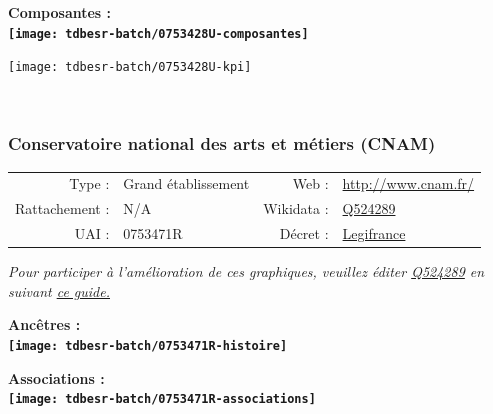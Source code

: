 \documentclass[12pt,french,]{article}
\begin{document}
\begin{center} \bf Composantes : \\  
\texttt{[image: tdbesr-batch/0753428U-composantes]} \end{center}

\begin{center}\texttt{[image: tdbesr-batch/0753428U-kpi]} \end{center}\checkoddpage

\ifoddpage \fi ~\newpage  

\hypertarget{conservatoire-national-des-arts-et-muxe9tiers-cnam}{%
\subsubsection{Conservatoire national des arts et métiers
(CNAM)}\label{conservatoire-national-des-arts-et-muxe9tiers-cnam}}

\begin{tabular*}{\textwidth}{rp{5cm}rl}  
\hline  
Type : & Grand établissement & Web : &\href{http://www.cnam.fr/}{http://www.cnam.fr/} \\  
Rattachement : & N/A & Wikidata : & \href{https://www.wikidata.org/entity/Q524289}{Q524289} \\  
UAI : & 0753471R & Décret : & \href{http://www.legifrance.gouv.fr/affichTexte.do?dateTexte=&categorieLien=id&cidTexte=JORFTEXT000021292171&fastPos=1&fastReqId=2018633024&oldAction=rechExpTexteJorf}{Legifrance} \\  
\hline  
\end{tabular*}

\textit{\scriptsize Pour participer à l'amélioration de ces graphiques, veuillez éditer  \href{https://www.wikidata.org/entity/Q524289}{Q524289}  en suivant \href{https://github.com/cpesr/wikidataESR/blob/master/Rmd/wikidataESR.md}{ce guide.}}

\vspace{1cm}  
\begin{minipage}[b]{0.50\textwidth}\begin{center} \bf Ancêtres : \\  
\texttt{[image: tdbesr-batch/0753471R-histoire]} \end{center}\end{minipage}\begin{minipage}[b]{0.50\textwidth}\begin{center} \bf Associations : \\  
\texttt{[image: tdbesr-batch/0753471R-associations]} \end{center}\end{minipage}
\end{document}
